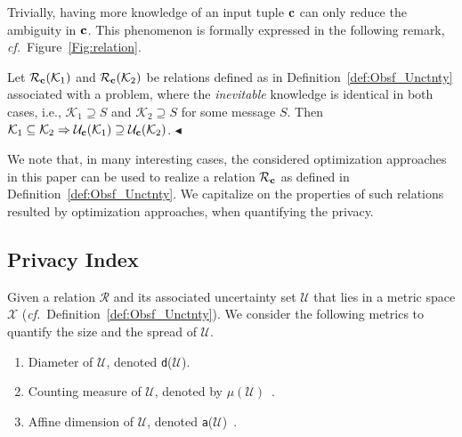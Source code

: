 \documentclass[12pt,draftcls,onecolumn]{IEEEtran}
\newcommand{\cf}{{\textit{cf.}}}
\renewcommand{\vec}[1]{\bf{#1}}     \newcommand{\vecsc}[1]{\mbox {\boldmath \scriptsize $#1$}}     \newcommand{\itvec}[1]{\mbox {\boldmath $#1$}}
\newcommand{\addnew}[1]{{{\color{blue!0!black}#1}}}
\begin{document}
\addnew{
Trivially, having more knowledge of an input tuple ${\vec c}$ can only reduce the ambiguity in ${\vec c}$. This phenomenon is formally expressed in the following remark, \cf~Figure~\ref{Fig:relation}.
\begin{remark}\label{remark:relation}
Let $\mathcal{R}_{\vec c}(\mathcal{K}_1)$ and $\mathcal{R}_{\vec c}(\mathcal{K}_2)$ be relations defined as in Definition~\ref{def:Obsf_Unctnty} associated with a problem, where the \emph{inevitable} knowledge is identical in both cases, i.e., $\mathcal{K}_1\supseteq S$ and $\mathcal{K}_2\supseteq S$ for some message $S$. Then $\mathcal{K}_1\subseteq\mathcal{K}_2\Rightarrow\mathcal{U}_{\vec c}(\mathcal{K}_1)\supseteq \mathcal{U}_{\vec c}(\mathcal{K}_2)$. \hfill $\blacktriangleleft$
\end{remark}
}



\addnew{We note that, in many interesting cases, the considered optimization approaches in this paper can be used to realize a relation $\mathcal{R}_{\vec c}$ as defined in Definition~\ref{def:Obsf_Unctnty}. We capitalize on the properties of such relations resulted by optimization approaches, when quantifying the privacy.}

\addnew{
\subsection{Privacy Index}\label{subsec:privacyIndex}
}

\addnew{Given a relation $\mathcal{R}$ and its associated uncertainty set $\mathcal{U}$ that lies in a metric space $\mathcal{X}$ (\cf~Definition~\ref{def:Obsf_Unctnty}). We consider the following metrics to quantify the size and the spread of $\mathcal{U}$.
\begin{enumerate}
\item Diameter of $\mathcal{U}$, denoted \texttt{d}($\mathcal{U}$).
\item Counting measure of $\mathcal{U}$, denoted by $\mu(\mathcal{U})$~\cite[p.~146]{McDonald-Weiss-2013}.
\item Affine dimension of $\mathcal{U}$, denoted \texttt{a}($\mathcal{U}$)~\cite[\S~2.1.3]{Boyd-Vandenberghe-04}.
\end{enumerate}
}
\end{document}
